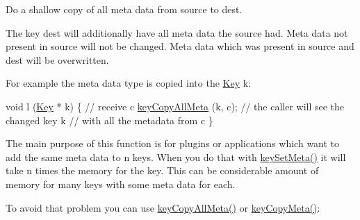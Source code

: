 Do a shallow copy of all meta data from source to dest. 

The key dest will additionally have all meta data the source had. Meta data not present in source will not be changed. Meta data which was present in source and dest will be overwritten.

For example the meta data type is copied into the \hyperlink{classkdb_1_1Key}{Key} k\+:


\begin{DoxyCodeInclude}
\textcolor{keywordtype}{void} l (\hyperlink{classkdb_1_1Key_a5679f5cae63caddd64a60388b9cc77fa}{Key} * k)
\{
        \textcolor{comment}{// receive c}
        \hyperlink{group__keymeta_ga8e63720a65610a29597494d0671f9401}{keyCopyAllMeta} (k, c);
        \textcolor{comment}{// the caller will see the changed key k}
        \textcolor{comment}{// with all the metadata from c}
\}
\end{DoxyCodeInclude}
 The main purpose of this function is for plugins or applications which want to add the same meta data to n keys. When you do that with \hyperlink{group__keymeta_gae1f15546b234ffb6007d8a31178652b9}{key\+Set\+Meta()} it will take n times the memory for the key. This can be considerable amount of memory for many keys with some meta data for each.

To avoid that problem you can use \hyperlink{group__keymeta_ga8e63720a65610a29597494d0671f9401}{key\+Copy\+All\+Meta()} or \hyperlink{group__keymeta_ga9a22b992478e613c8788bd460b4a1f0c}{key\+Copy\+Meta()}\+:



